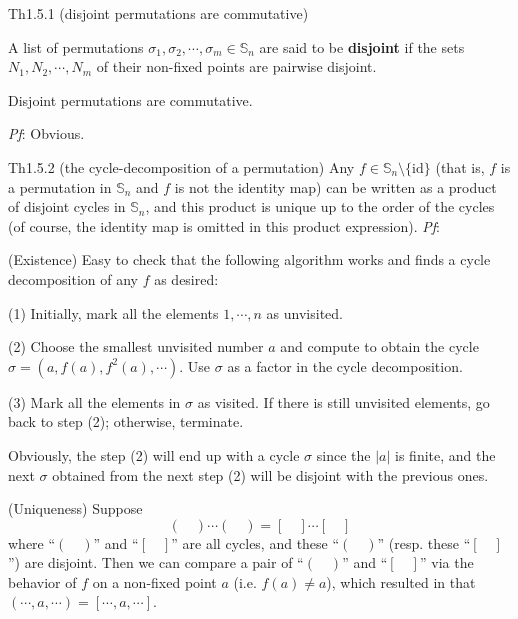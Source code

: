 \documentclass{article}
\begin{document}
\begin{Th}{Th1.5.1 (disjoint permutations are commutative)}
    \begin{compactenum}
        \item \textcolor{Df}{A list of permutations $\sigma_1, \sigma_2, \cdots, \sigma_m\in\mathbb{S}_n$ are said to be \textbf{disjoint} if the sets $N_1, N_2, \cdots, N_m$ of their non-fixed points are pairwise disjoint.} 
        \item Disjoint permutations are commutative.
    \end{compactenum}
    \tcblower
    \textit{Pf}: Obvious. 
\end{Th}

\begin{Th}{Th1.5.2 (the cycle-decomposition of a permutation)}
    Any $f\in\mathbb{S}_n\setminus \{\mathrm{id}\}$ (that is, $f$ is a permutation in $\mathbb{S}_n$ and $f$ is not the identity map) can be written as a product of disjoint cycles in $\mathbb{S}_n$, and this product is unique up to the order of the cycles (of course, the identity map is omitted in this product expression). 
    \tcblower
    \textit{Pf}: 
    \begin{compactenum}
        \item (Existence) Easy to check that the following algorithm works and finds a cycle decomposition of any $f$ as desired:
        \begin{compactenum}
            \item[(1)] Initially, mark all the elements $1, \cdots, n$ as unvisited.
            \item[(2)] Choose the smallest unvisited number $a$ and compute to obtain the cycle $\sigma = (a, f(a), f^2(a), \cdots)$. Use $\sigma$ as a factor in the cycle decomposition.
            \item[(3)] Mark all the elements in $\sigma$ as visited. If there is still unvisited elements, go back to step (2); otherwise, terminate.
        \end{compactenum}
        Obviously, the step (2) will end up with a cycle $\sigma$ since the $|a|$ is finite, and the next $\sigma$ obtained from the next step (2) will be disjoint with the previous ones.
        \item (Uniqueness) Suppose 
        $$ (\quad)\cdots(\quad) = [\quad]\cdots[\quad] $$
        where ``$(\quad)$'' and ``$[\quad]$'' are all cycles, and these ``$(\quad)$'' (resp. these ``$[\quad]$'') are disjoint. Then we can compare a pair of ``$(\quad)$'' and ``$[\quad]$'' via the behavior of $f$ on a non-fixed point $a$ (i.e. $f(a)\neq a$), which resulted in that $(\cdots, a, \cdots) = [\cdots, a, \cdots]$. 
    \end{compactenum}
\end{Th}
\end{document}
